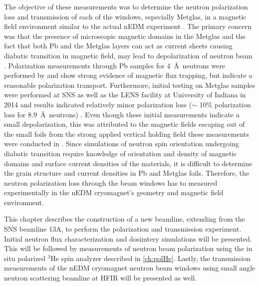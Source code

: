 The objective of these measurements was to determine the neutron polarization loss and transmission of each of the windows, especially Metglas, in a magnetic field environment similar to the actual nEDM experiment \cite{Ahmed2019}. The primary concern was that the presence of microscopic magnetic domains in the Metglas and the fact that both Pb and the Metglas layers can act as current sheets causing diabatic transition in magnetic field, may lead to depolarization of neutron beam \cite{Ahmed2019}. Polarization measurements through Pb samples for 4~\AA\ neutrons were performed by \cite{Treimer2012} and show strong evidence of magnetic flux trapping, but indicate a reasonable polarization transport. Furthermore, initial testing on Metglas samples were performed at SNS as well as the LENS facility at University of Indiana in 2014 and results indicated relatively minor polarization loss ($\sim$ 10\% polarization loss for 8.9~\AA\ neutrons) \cite{DEFT2014}. Even though these initial measurements indicate a small depolarization, this was attributed to the magnetic fields escaping out of the small foils from the strong applied vertical holding field these measurements were conducted in \cite{DEFT2014, Ahmed2019}. Since simulations of neutron spin orientation undergoing diabatic transition require knowledge of orientation and density of magnetic domains and surface current densities of the materials, it is difficult to determine the grain structure and current densities in Pb and Metglas foils. Therefore, the neutron polarization loss through the beam windows has to measured experimentally in the nEDM cryomagnet's geometry and magnetic field environment. 

This chapter describes the construction of a new beamline, extending from the SNS beamline 13A, to perform the polarization and transmission experiment. Initial neutron flux characterization and dosimtery simulations will be presented. This will be followed by measurements of neutron beam polarization using the in situ polarized $^3$He spin analyzer described in \cref{ch:polHe}. Lastly, the transmission measurements of the nEDM cryomagnet neutron beam windows using small angle neutron scattering beamline at HFIR will be presented as well.

